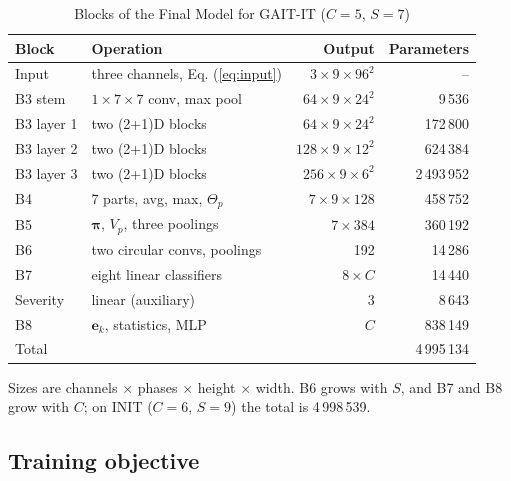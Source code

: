 \documentclass[conference]{IEEEtran}
\begin{document}
\begin{table}[t]
\centering
\footnotesize
\caption{Blocks of the Final Model for GAIT-IT ($C=5$, $S=7$)}
\label{tab:params}
\begin{tabular}{llrr}
\toprule
Block & Operation & Output & Parameters \\
\midrule
Input & three channels, Eq. (\ref{eq:input}) & $3\times9\times96^2$ & -- \\
B3 stem & $1\times7\times7$ conv, max pool & $64\times9\times24^2$ & 9\,536 \\
B3 layer 1 & two (2+1)D blocks & $64\times9\times24^2$ & 172\,800 \\
B3 layer 2 & two (2+1)D blocks & $128\times9\times12^2$ & 624\,384 \\
B3 layer 3 & two (2+1)D blocks & $256\times9\times6^2$ & 2\,493\,952 \\
B4 & 7 parts, avg, max, $\Theta_p$ & $7\times9\times128$ & 458\,752 \\
B5 & $\boldsymbol{\pi}$, $V_p$, three poolings & $7\times384$ & 360\,192 \\
B6 & two circular convs, poolings & 192 & 14\,286 \\
B7 & eight linear classifiers & $8\times C$ & 14\,440 \\
Severity & linear (auxiliary) & 3 & 8\,643 \\
B8 & $\mathbf{e}_k$, statistics, MLP & $C$ & 838\,149 \\
Total & & & 4\,995\,134 \\
\bottomrule
\end{tabular}

\vspace{2pt}
\footnotesize Sizes are channels $\times$ phases $\times$ height $\times$ width. B6 grows with $S$, and B7 and B8 grow with $C$; on INIT ($C=6$, $S=9$) the total is 4\,998\,539.
\end{table}

\subsection{Training objective}
\end{document}
